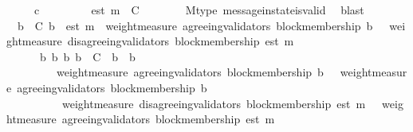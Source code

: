 \begin{isabellebody}
\ \ \ \ \ {\isachardoublequoteopen}c\ {\isasymin}\ {\isasymepsilon}\ {\isasymsigma}{\isacharprime}{\isachardoublequoteclose}\isanewline
\ \ \ \ \isamarkupfalse%
\ {\isachardoublequoteopen}est\ m\ {\isasymin}\ C{\isachardoublequoteclose}\isanewline
\ \ \ \ \ \ \isamarkupfalse%
\ M{\isacharunderscore}type\ message{\isacharunderscore}in{\isacharunderscore}state{\isacharunderscore}is{\isacharunderscore}valid\ \isamarkupfalse%
\ blast\isanewline
\ \ \ \ \isamarkupfalse%
\ {\isachardoublequoteopen}{\isasymforall}\ b{\isacharprime}\ {\isasymin}\ C{\isachardot}\ b{\isacharprime}\ {\isasymdownharpoonright}\ est\ m\ {\isasymlongrightarrow}\ weight{\isacharunderscore}measure\ {\isacharparenleft}agreeing{\isacharunderscore}validators\ {\isacharparenleft}block{\isacharunderscore}membership\ b{\isacharprime}{\isacharcomma}\ {\isasymsigma}{\isacharprime}{\isacharparenright}{\isacharparenright}\ {\isachargreater}\ weight{\isacharunderscore}measure\ {\isacharparenleft}disagreeing{\isacharunderscore}validators\ {\isacharparenleft}block{\isacharunderscore}membership\ {\isacharparenleft}est\ m{\isacharparenright}{\isacharcomma}\ {\isasymsigma}{\isacharprime}{\isacharparenright}{\isacharparenright}{\isachardoublequoteclose}\isanewline
\ \ \ \ \ \ \isamarkupfalse%
\ {\isacartoucheopen}{\isasymforall}\ {\isasymsigma}\ {\isasymin}\ {\isasymSigma}{\isachardot}\ {\isasymforall}\ b\ b{\isacharprime}{\isachardot}\ {\isacharbraceleft}b{\isacharcomma}\ b{\isacharprime}{\isacharbraceright}\ {\isasymsubseteq}\ C\ {\isasymand}\ b{\isacharprime}\ {\isasymdownharpoonright}\ b\ \isanewline
\ \ \ \ \ \ \ \ {\isasymlongrightarrow}\ weight{\isacharunderscore}measure\ {\isacharparenleft}agreeing{\isacharunderscore}validators\ {\isacharparenleft}block{\isacharunderscore}membership\ b{\isacharprime}{\isacharcomma}\ {\isasymsigma}{\isacharparenright}{\isacharparenright}\ {\isasymge}\ weight{\isacharunderscore}measure\ {\isacharparenleft}agreeing{\isacharunderscore}validators\ {\isacharparenleft}block{\isacharunderscore}membership\ b{\isacharcomma}\ {\isasymsigma}{\isacharparenright}{\isacharparenright}{\isacartoucheclose}\isanewline
\ \ \ \ \ \ \ \ \ \ {\isacartoucheopen}weight{\isacharunderscore}measure\ {\isacharparenleft}disagreeing{\isacharunderscore}validators\ {\isacharparenleft}block{\isacharunderscore}membership\ {\isacharparenleft}est\ m{\isacharparenright}{\isacharcomma}\ {\isasymsigma}{\isacharprime}{\isacharparenright}{\isacharparenright}\ {\isacharless}\ weight{\isacharunderscore}measure\ {\isacharparenleft}agreeing{\isacharunderscore}validators\ {\isacharparenleft}block{\isacharunderscore}membership\ {\isacharparenleft}est\ m{\isacharparenright}{\isacharcomma}\ {\isasymsigma}{\isacharprime}{\isacharparenright}{\isacharparenright}{\isacartoucheclose}\isanewline

\end{isabellebody}
